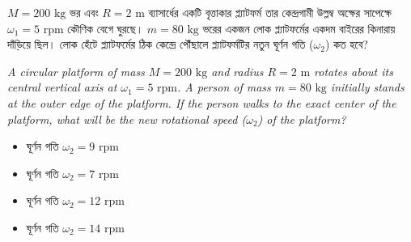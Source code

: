 \documentclass[12pt, a4paper]{article}
\begin{document}
\newpage
\begin{tcolorbox}[questionbox={প্রশ্ন (Question) 46}]
\noindent
$M = 200\text{ kg}$ ভর এবং $R = 2\text{ m}$ ব্যাসার্ধের একটি বৃত্তাকার প্ল্যাটফর্ম তার কেন্দ্রগামী উল্লম্ব অক্ষের সাপেক্ষে $\omega_1 = 5\text{ rpm}$ কৌণিক বেগে ঘুরছে। $m = 80\text{ kg}$ ভরের একজন লোক প্ল্যাটফর্মের একদম বাইরের কিনারায় দাঁড়িয়ে ছিল। লোক হেঁটে প্ল্যাটফর্মের ঠিক কেন্দ্রে পৌঁছালে প্ল্যাটফর্মটির নতুন ঘূর্ণন গতি ($\omega_2$) কত হবে?

\vspace{0.8em}
\begin{english}
\noindent\textit{\color{darkgray}
A circular platform of mass $M = 200\text{ kg}$ and radius $R = 2\text{ m}$ rotates about its central vertical axis at $\omega_1 = 5\text{ rpm}$. A person of mass $m = 80\text{ kg}$ initially stands at the outer edge of the platform. If the person walks to the exact center of the platform, what will be the new rotational speed ($\omega_2$) of the platform?
}
\end{english}
\end{tcolorbox}

\vspace{1em}
\begin{center}
\end{center}
\vspace{1em}

\begin{itemize}[label={}, leftmargin=1cm, itemsep=0.5em]
\item[\textbf{A)}] ঘূর্ণন গতি $\omega_2 = 9\text{ rpm}$
\item[\textbf{B)}] ঘূর্ণন গতি $\omega_2 = 7\text{ rpm}$
\item[\textbf{C)}] ঘূর্ণন গতি $\omega_2 = 12\text{ rpm}$
\item[\textbf{D)}] ঘূর্ণন গতি $\omega_2 = 14\text{ rpm}$
\end{itemize}
\end{document}
